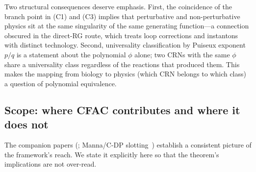 \documentclass[11pt,a4paper]{article}
\theoremstyle{plain}
\theoremstyle{definition}
\begin{document}
Two structural consequences deserve emphasis.  First, the
coincidence of the branch point in (C1) and (C3) implies that
perturbative and non-perturbative physics sit at the same
singularity of the same generating function---a connection
obscured in the direct-RG route, which treats loop corrections
and instantons with distinct technology.  Second, universality
classification by Puiseux exponent $p/q$ is a statement about
the polynomial $\phi$ alone; two CRNs with the same $\phi$ share
a universality class regardless of the reactions that produced
them.  This makes the mapping from biology to physics (which CRN
belongs to which class) a question of polynomial equivalence.

\subsection{Scope: where CFAC contributes and where it does not}
\label{sec:scope}

The companion papers
(\citep{AmarteifioAnts2026,Amarteifio2026LDWC,Amarteifio2026TwoLoop};
Manna/C-DP slotting~\citep{AmarteifioManna2026})
establish a consistent picture of the framework's reach.  We state
it explicitly here so that the theorem's implications are not
over-read.
\end{document}
